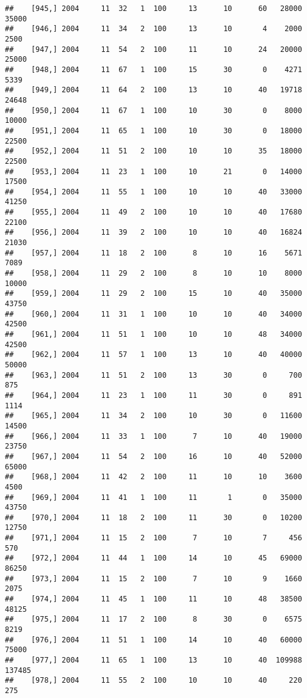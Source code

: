 \documentclass{article}\usepackage[]{graphicx}\usepackage[]{color}
\makeatletter
\newenvironment{kframe}{%
 \def\at@end@of@kframe{}%
 \ifinner\ifhmode%
  \def\at@end@of@kframe{\end{minipage}}%
  \begin{minipage}{\columnwidth}%
 \fi\fi%
 \def\FrameCommand##1{\hskip\@totalleftmargin \hskip-\fboxsep
 \colorbox{shadecolor}{##1}\hskip-\fboxsep
     \hskip-\linewidth \hskip-\@totalleftmargin \hskip\columnwidth}%
 \MakeFramed {\advance\hsize-\width
   \@totalleftmargin\z@ \linewidth\hsize
   \@setminipage}}%
 {\par\unskip\endMakeFramed%
 \at@end@of@kframe}
\newenvironment{knitrout}{}{} %
\makeatother
\begin{document}
\begin{knitrout}
\begin{kframe}
\begin{verbatim}
##    [945,] 2004     11  32   1  100     13      10      60   28000   35000
##    [946,] 2004     11  34   2  100     13      10       4    2000    2500
##    [947,] 2004     11  54   2  100     11      10      24   20000   25000
##    [948,] 2004     11  67   1  100     15      30       0    4271    5339
##    [949,] 2004     11  64   2  100     13      10      40   19718   24648
##    [950,] 2004     11  67   1  100     10      30       0    8000   10000
##    [951,] 2004     11  65   1  100     10      30       0   18000   22500
##    [952,] 2004     11  51   2  100     10      10      35   18000   22500
##    [953,] 2004     11  23   1  100     10      21       0   14000   17500
##    [954,] 2004     11  55   1  100     10      10      40   33000   41250
##    [955,] 2004     11  49   2  100     10      10      40   17680   22100
##    [956,] 2004     11  39   2  100     10      10      40   16824   21030
##    [957,] 2004     11  18   2  100      8      10      16    5671    7089
##    [958,] 2004     11  29   2  100      8      10      10    8000   10000
##    [959,] 2004     11  29   2  100     15      10      40   35000   43750
##    [960,] 2004     11  31   1  100     10      10      40   34000   42500
##    [961,] 2004     11  51   1  100     10      10      48   34000   42500
##    [962,] 2004     11  57   1  100     13      10      40   40000   50000
##    [963,] 2004     11  51   2  100     13      30       0     700     875
##    [964,] 2004     11  23   1  100     11      30       0     891    1114
##    [965,] 2004     11  34   2  100     10      30       0   11600   14500
##    [966,] 2004     11  33   1  100      7      10      40   19000   23750
##    [967,] 2004     11  54   2  100     16      10      40   52000   65000
##    [968,] 2004     11  42   2  100     11      10      10    3600    4500
##    [969,] 2004     11  41   1  100     11       1       0   35000   43750
##    [970,] 2004     11  18   2  100     11      30       0   10200   12750
##    [971,] 2004     11  15   2  100      7      10       7     456     570
##    [972,] 2004     11  44   1  100     14      10      45   69000   86250
##    [973,] 2004     11  15   2  100      7      10       9    1660    2075
##    [974,] 2004     11  45   1  100     11      10      48   38500   48125
##    [975,] 2004     11  17   2  100      8      30       0    6575    8219
##    [976,] 2004     11  51   1  100     14      10      40   60000   75000
##    [977,] 2004     11  65   1  100     13      10      40  109988  137485
##    [978,] 2004     11  55   2  100     10      10      40     220     275

\end{verbatim}
\end{kframe}
\end{knitrout}
\end{document}
